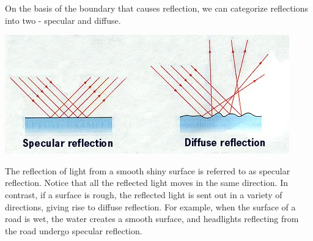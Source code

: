 \documentclass[11pt]{article}
\begin{document}
	On the basis of the boundary that causes reflection, we can categorize reflections into two - specular and diffuse.
	\begin{center}
		\includegraphics[scale=0.6]{reflection_types}
	\end{center}
	The reflection of light from a smooth shiny surface is
	referred to as specular reflection. Notice that all the reflected light moves in the same direction. In contrast, if a surface is rough, the reflected light is sent out in a variety of directions, giving rise to diffuse reflection. For example, when the surface of a road is wet, the water creates a smooth surface, and headlights reflecting from the road undergo specular reflection.
\end{document}
